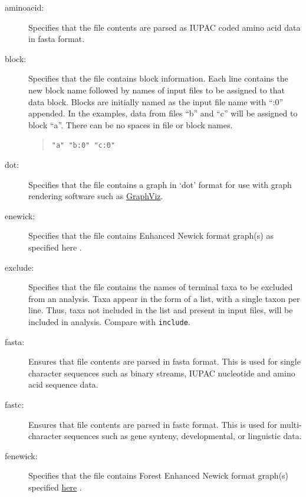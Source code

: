 	\begin{description}
		\item [aminoacid:] Specifies that the file contents are parsed as IUPAC coded amino 
		acid data in fasta \citep{PearsonandLipman1988} format.

		\item [block:] Specifies that the file contains block %
		information. Each line contains 
		the new block name followed by names of input files to be assigned to that data block. 
		Blocks are initially named as the input file name with ``:0'' appended. In the examples, 
		data from files ``b'' and ``c'' will be assigned to block ``a''. There can be no spaces in 
		file or block names.
			
			\begin{quote}
					\texttt{"a" "b:0" "c:0"}
			\end{quote}
	
		\item [dot:] Specifies that the file contains a graph in `dot' format for use with graph 
		rendering software such as \href{https://en.wikipedia.org/wiki/Graphviz}{GraphViz}.
			
		\item [enewick:] Specifies that the file contains Enhanced Newick format graph(s) as
		specified here \citep{Cardonaetal2008}. 
			
		\item [exclude:] Specifies that the file contains the names of terminal taxa to be 
		excluded from an analysis. Taxa appear in the form of a list, with a single taxon per 
		line. Thus, taxa not included in the list and present in input files, will be included in 
		analysis. Compare with \texttt{include}.
			
		\item [fasta:] Ensures that file contents are parsed in fasta \citep{PearsonandLipman1988}
		format. This is used for single character sequences such as binary streams, IUPAC 
		nucleotide and amino acid sequence data.
			
		\item [fastc:] Ensures that file contents are parsed in fastc \citep{WheelerandWashburn2019}
		format. This is used for multi-character sequences such as gene synteny, developmental, 
		or linguistic data.
			
		\item [fenewick:] Specifies that the file contains Forest Enhanced Newick format graph(s)  
		specified \href{https://www.github.com/wardwheeler/euncon}{here} \citep{Wheeler2022}.
			

\end{description}
